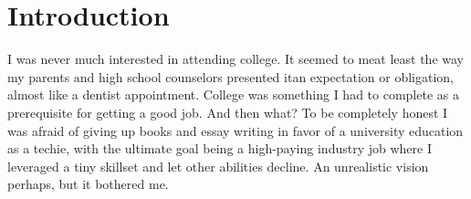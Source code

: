 \documentclass{article}
\begin{document}
\newcommand{\phd}{Ph.D.}
\newcommand{\university}{%
\texttt{<your-college-here>}
}



\newcommand{\sloc}{7.7 million lines}
\newcommand{\numprojects}{43}





\section{Introduction}
I was never much interested in attending college.
It seemed to me\textemdash at least the way my parents and high school counselors presented it\textemdash an expectation or obligation, almost like a dentist appointment. 
College was something I had to complete as a prerequisite for getting a good job.
And then what? 
To be completely honest I was afraid of giving up books and essay writing in favor of a university education as a techie, with the ultimate goal being a high-paying industry job where I leveraged a tiny skillset and let other abilities decline. 
An unrealistic vision perhaps, but it bothered me. 
\end{document}
